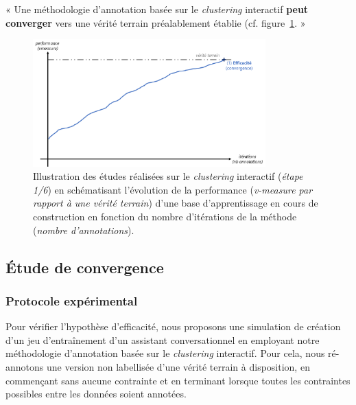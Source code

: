 		\begin{tcolorbox}[
			title=\textbf{Hypothèse d'efficacité},
			colback=gray!20,
			colframe=gray!50!black!75,
			width=\linewidth
		]
			« Une méthodologie d'annotation basée sur le \textit{clustering} interactif \textbf{peut converger} vers une vérité terrain préalablement établie (cf. figure~\ref{figure:HYPOTHESE-EFFICACITE}. »
			
			\begin{figure}[H]
				\centering
				\includegraphics[width=0.8\textwidth]{figures/hypotheses-01-efficacite}
				\caption{Illustration des études réalisées sur le \textit{clustering} interactif (\textit{étape 1/6}) en schématisant l'évolution de la performance (\textit{v-measure par rapport à une vérité terrain}) d'une base d'apprentissage en cours de construction en fonction du nombre d'itérations de la méthode (\textit{nombre d'annotations}).}
				\label{figure:HYPOTHESE-EFFICACITE}
			\end{figure}

		\end{tcolorbox}
		
		\subsection{Étude de convergence}
	
			\subsubsection{Protocole expérimental}
			
				Pour vérifier l'hypothèse d'efficacité, nous proposons une simulation de création d'un jeu d’entraînement d'un assistant conversationnel en employant notre méthodologie d'annotation basée sur le \textit{clustering} interactif.
				Pour cela, nous ré-annotons une version non labellisée d'une vérité terrain à disposition, en commençant sans aucune contrainte et en terminant lorsque toutes les contraintes possibles entre les données soient annotées.
				
